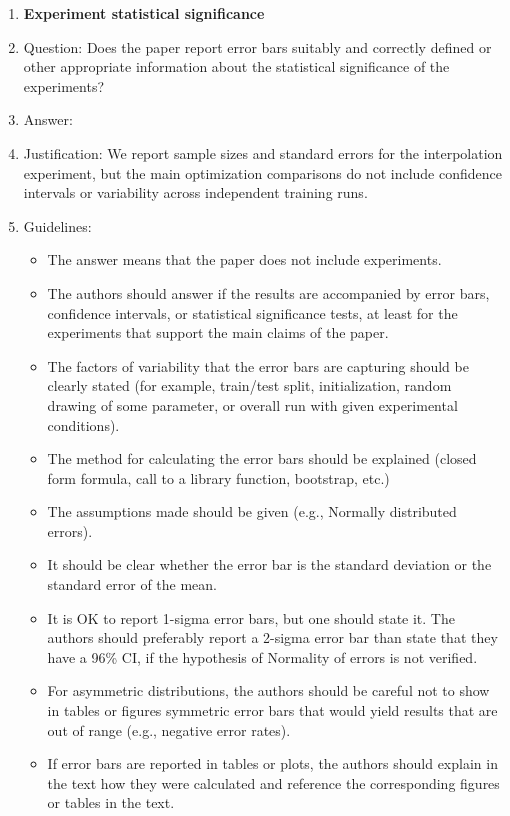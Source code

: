 \documentclass{article}
\theoremstyle{plain}
\theoremstyle{definition}
\theoremstyle{remark}
\begin{document}
\begin{enumerate}
\item {\bf Experiment statistical significance}
    \item[] Question: Does the paper report error bars suitably and correctly defined or other appropriate information about the statistical significance of the experiments?
    \item[] Answer: \answerNo{} %
    \item[] Justification: We report sample sizes and standard errors for the interpolation experiment, but the main optimization comparisons do not include confidence intervals or variability across independent training runs.
    \item[] Guidelines:
    \begin{itemize}
        \item The answer \answerNA{} means that the paper does not include experiments.
        \item The authors should answer \answerYes{} if the results are accompanied by error bars, confidence intervals, or statistical significance tests, at least for the experiments that support the main claims of the paper.
        \item The factors of variability that the error bars are capturing should be clearly stated (for example, train/test split, initialization, random drawing of some parameter, or overall run with given experimental conditions).
        \item The method for calculating the error bars should be explained (closed form formula, call to a library function, bootstrap, etc.)
        \item The assumptions made should be given (e.g., Normally distributed errors).
        \item It should be clear whether the error bar is the standard deviation or the standard error of the mean.
        \item It is OK to report 1-sigma error bars, but one should state it. The authors should preferably report a 2-sigma error bar than state that they have a 96\% CI, if the hypothesis of Normality of errors is not verified.
        \item For asymmetric distributions, the authors should be careful not to show in tables or figures symmetric error bars that would yield results that are out of range (e.g., negative error rates).
        \item If error bars are reported in tables or plots, the authors should explain in the text how they were calculated and reference the corresponding figures or tables in the text.
    \end{itemize}


\end{enumerate}
\end{document}
